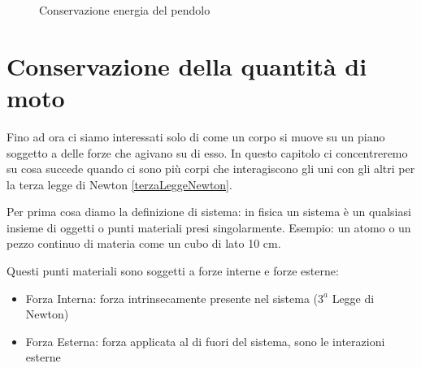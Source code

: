 \def\L{2.8} %
    \def\ang{32} %
    \def\R{0.25} %
\begin{figure}[tb]
    \centering
    \caption{Conservazione energia del pendolo}
    \label{fig:conservazioneEnergiaPendolo}
\end{figure}

\newpage
\section{Conservazione della quantità di moto}

Fino ad ora ci siamo interessati solo di come un corpo si muove su un piano soggetto a delle forze che agivano su di esso.
In questo capitolo ci concentreremo su cosa succede quando ci sono più corpi che interagiscono gli uni con gli altri per la terza legge di Newton \ref{terzaLeggeNewton}. 

Per prima cosa diamo la definizione di sistema: 
in fisica un sistema è un qualsiasi insieme di oggetti o punti materiali presi singolarmente. Esempio: un atomo o un pezzo continuo di materia come un cubo di lato 10 cm.

Questi punti materiali sono soggetti a forze interne e forze esterne:
\begin{itemize}
    \item Forza Interna: forza intrinsecamente presente nel sistema ($3^a$ Legge di Newton)
    \item Forza Esterna: forza applicata al di fuori del sistema, sono le interazioni esterne
\end{itemize}

